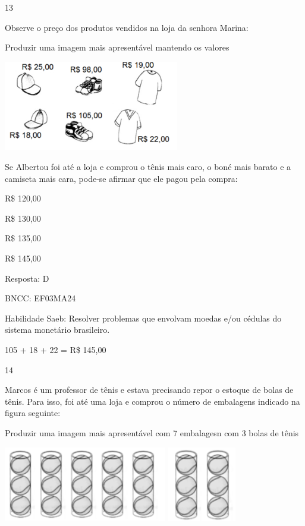 \begin{escolha}
{\begin{escolha}
{\num{13}

Observe o preço dos produtos vendidos na loja da senhora Marina:

Produzir uma imagem mais apresentável mantendo os valores

\includegraphics[width=3.02451in,height=1.54853in]{media/image138.png}

Se Albertou foi até a loja e comprou o tênis mais caro, o boné mais
barato e a camiseta mais cara, pode-se afirmar que ele pagou pela
compra:

\begin{escolha}

\item
  R\$ 120,00
\item
  R\$ 130,00
\item
  R\$ 135,00
\item
  R\$ 145,00
\end{escolha}

Resposta: D

BNCC: EF03MA24

Habilidade Saeb: Resolver problemas que envolvam moedas e/ou cédulas do
sistema monetário brasileiro.

105 + 18 + 22 = R\$ 145,00

\num{14}

Marcos é um professor de tênis e estava precisando repor o estoque de
bolas de tênis. Para isso, foi até uma loja e comprou o número de
embalagens indicado na figura seguinte:

Produzir uma imagem mais apresentável com 7 embalagesn com 3 bolas de
tênis

\includegraphics[width=2.80882in,height=1.29243in]{media/image139.png}
\includegraphics[width=1.18628in,height=1.28713in]{media/image140.png}

}
\end{escolha}}
\end{escolha}
